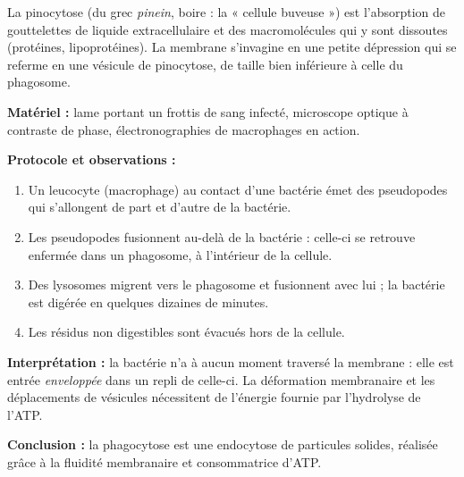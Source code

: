 \documentclass[11pt]{article}
\newcommand{\cle}[1]{{\popxbold\color{popdark}#1}}
\begin{document}
\begin{definition}[Pinocytose]
La \cle{pinocytose} (du grec \emph{pinein}, boire : la « cellule buveuse ») est l'absorption de \cle{gouttelettes de liquide extracellulaire} et des macromolécules qui y sont dissoutes (protéines, lipoprotéines). La membrane s'invagine en une petite dépression qui se referme en une \cle{vésicule de pinocytose}, de taille bien inférieure à celle du phagosome.
\end{definition}

\begin{experience}
\textbf{Matériel :} lame portant un frottis de sang infecté, microscope optique à contraste de phase, électronographies de macrophages en action.

\textbf{Protocole et observations :}
\begin{enumerate}
\item Un leucocyte (macrophage) au contact d'une bactérie émet des pseudopodes qui s'allongent de part et d'autre de la bactérie.
\item Les pseudopodes fusionnent au-delà de la bactérie : celle-ci se retrouve enfermée dans un phagosome, à l'intérieur de la cellule.
\item Des lysosomes migrent vers le phagosome et fusionnent avec lui ; la bactérie est digérée en quelques dizaines de minutes.
\item Les résidus non digestibles sont évacués hors de la cellule.
\end{enumerate}

\textbf{Interprétation :} la bactérie n'a à aucun moment traversé la membrane : elle est entrée \emph{enveloppée} dans un repli de celle-ci. La déformation membranaire et les déplacements de vésicules nécessitent de l'énergie fournie par l'hydrolyse de l'ATP.

\textbf{Conclusion :} la phagocytose est une endocytose de particules solides, réalisée grâce à la fluidité membranaire et consommatrice d'ATP.
\end{experience}
\end{document}
